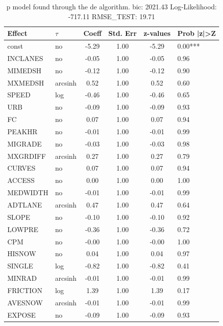 \begin{table}
	\caption{p model found through the de algorithm. bic: 2021.43 Log-Likelihood: -717.11 RMSE_TEST: 19.71}
	\begin{center}
		\begin{tabular}{|l|l|c|c|c|l|}
			\hline
			Effect & $\tau$ & Coeff & Std. Err & z-values & Prob |z|>Z \\
			\hline
			const & no & -5.29 & 1.00 & -5.29 & 0.00*** \\
			\hline
			INCLANES & no & -0.05 & 1.00 & -0.05 & 0.96 \\
			\hline
			MIMEDSH & no & -0.12 & 1.00 & -0.12 & 0.90 \\
			\hline
			MXMEDSH & arcsinh & 0.52 & 1.00 & 0.52 & 0.60 \\
			\hline
			SPEED & log & -0.46 & 1.00 & -0.46 & 0.65 \\
			\hline
			URB & no & -0.09 & 1.00 & -0.09 & 0.93 \\
			\hline
			FC & no & 0.07 & 1.00 & 0.07 & 0.94 \\
			\hline
			PEAKHR & no & -0.01 & 1.00 & -0.01 & 0.99 \\
			\hline
			MIGRADE & no & -0.03 & 1.00 & -0.03 & 0.98 \\
			\hline
			MXGRDIFF & arcsinh & 0.27 & 1.00 & 0.27 & 0.79 \\
			\hline
			CURVES & no & 0.07 & 1.00 & 0.07 & 0.94 \\
			\hline
			ACCESS & no & 0.00 & 1.00 & 0.00 & 1.00 \\
			\hline
			MEDWIDTH & no & -0.01 & 1.00 & -0.01 & 0.99 \\
			\hline
			ADTLANE & arcsinh & 0.47 & 1.00 & 0.47 & 0.64 \\
			\hline
			SLOPE & no & -0.10 & 1.00 & -0.10 & 0.92 \\
			\hline
			LOWPRE & no & -0.36 & 1.00 & -0.36 & 0.72 \\
			\hline
			CPM & no & -0.00 & 1.00 & -0.00 & 1.00 \\
			\hline
			HISNOW & no & 0.04 & 1.00 & 0.04 & 0.97 \\
			\hline
			SINGLE & log & -0.82 & 1.00 & -0.82 & 0.41 \\
			\hline
			MINRAD & arcsinh & -0.01 & 1.00 & -0.01 & 0.99 \\
			\hline
			FRICTION & log & 1.39 & 1.00 & 1.39 & 0.17 \\
			\hline
			AVESNOW & arcsinh & -0.01 & 1.00 & -0.01 & 0.99 \\
			\hline
			EXPOSE & no & -0.09 & 1.00 & -0.09 & 0.93 \\

\end{tabular}
\end{center}
\end{table}
